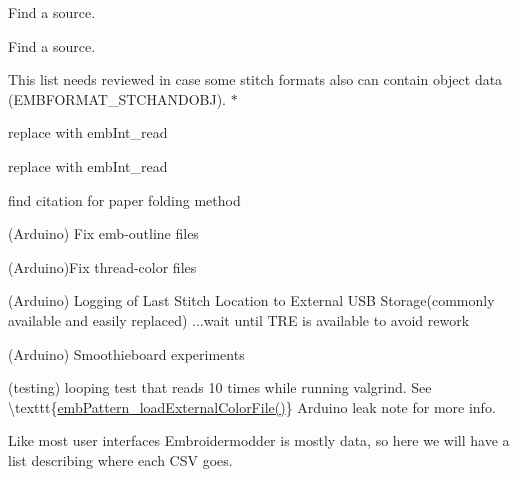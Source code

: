 \begin{DoxyRefList}
\label{todo__todo000434}%
%
Find a source.

\label{todo__todo000433}%
%
Find a source. 
\item[Global \mbox{\hyperlink{formats_8c_a8cb11404ce46501561f956d33f8dcf95}{format\+Table}} \mbox{[}number\+Of\+Formats\mbox{]}]\label{todo__todo000411}%
%
This list needs reviewed in case some stitch formats also can contain object data (EMBFORMAT\+\_\+\+STCHANDOBJ). $\ast$  
\item[Global \mbox{\hyperlink{formats_8c_a05fb50e7292226bc2947dd2b4da7a9bd}{fread\+\_\+int32\+\_\+be}} (FILE $\ast$f)]\label{todo__todo000413}%
%
replace with emb\+Int\+\_\+read  
\item[Global \mbox{\hyperlink{formats_8c_a2bcdb1e6bf6930d5c054ecdca9831eba}{fread\+\_\+uint16}} (FILE $\ast$f)]\label{todo__todo000412}%
%
replace with emb\+Int\+\_\+read  
\item[Global \mbox{\hyperlink{fill_8c_ad02b5d945eacff708d2bf084c40044d8}{generate\+\_\+dragon\+\_\+curve}} (char $\ast$state, int iterations)]\label{todo__todo000406}%
%
find citation for paper folding method  
\item[Page \mbox{\hyperlink{md_extern_libembroidery_src_geometry_geometry}{Geometry and Algorithms}} ]\label{todo__todo000424}%
%
(Arduino) Fix emb-\/outline files

\label{todo__todo000425}%
%
(Arduino)Fix thread-\/color files

\label{todo__todo000426}%
%
(Arduino) Logging of Last Stitch Location to External USB Storage(commonly available and easily replaced) ...wait until TRE is available to avoid rework

\label{todo__todo000428}%
%
(Arduino) Smoothieboard experiments

\label{todo__todo000429}%
%
(testing) looping test that reads 10 times while running valgrind. See \textbackslash{}texttt\{\mbox{\hyperlink{embroidery_8h_a3bf191bd99e2da8d36465f454a4646f6}{emb\+Pattern\+\_\+load\+External\+Color\+File()}}\} Arduino leak note for more info.

\label{todo__todo000430}%
%
Like most user interfaces Embroidermodder is mostly data, so here we will have a list describing where each CSV goes.


\end{DoxyRefList}
